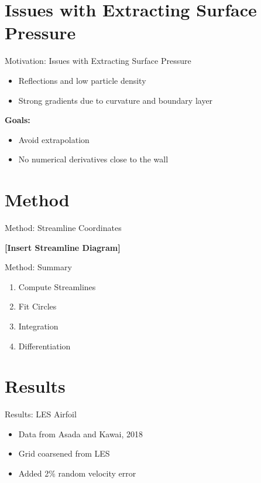 \documentclass{beamer}
\begin{document}
\section{Issues with Extracting Surface Pressure}
\begin{frame}{Motivation: Issues with Extracting Surface Pressure}
    \begin{itemize}
        \item Reflections and low particle density
        \item Strong gradients due to curvature and boundary layer
    \end{itemize}
    \textbf{Goals:}
    \begin{itemize}
        \item Avoid extrapolation
        \item No numerical derivatives close to the wall
    \end{itemize}
\end{frame}

\section{Method}
\begin{frame}{Method: Streamline Coordinates}
    \begin{center}
        \textbf{[Insert Streamline Diagram]}
    \end{center}
\end{frame}

\begin{frame}{Method: Summary}
    \begin{enumerate}
        \item Compute Streamlines
        \item Fit Circles
        \item Integration
        \item Differentiation
    \end{enumerate}
\end{frame}

\section{Results}
\begin{frame}{Results: LES Airfoil}
    \begin{itemize}
        \item Data from Asada and Kawai, 2018
        \item Grid coarsened from LES
        \item Added 2\% random velocity error
    \end{itemize}
\end{frame}
\end{document}
